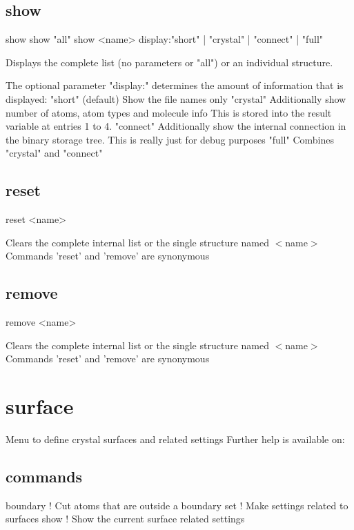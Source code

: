 \subsection*{show}
\begin{MacVerbatim}
show
show "all"
show <name>
   display:{"short" | "crystal" | "connect" | "full"}
\end{MacVerbatim}
Displays the complete list (no parameters or "all") 
or an individual structure. 
\par
The optional parameter "display:" determines the amount of 
information that is displayed: 
"short" (default)  Show the file names only 
"crystal"          Additionally show number of atoms, 
                   atom types and molecule info 
                   This is stored into the result variable 
                   at entries 1 to 4. 
"connect"          Additionally show the internal connection 
                   in the binary storage tree. This is really 
                   just for debug purposes 
"full"             Combines "crystal" and "connect" 
\subsection*{reset}
\begin{MacVerbatim}
reset {<name>}
\end{MacVerbatim}
Clears the complete internal list or the single structure 
named $ <$name$> $ 
Commands 'reset' and 'remove' are synonymous 
\subsection*{remove}
\begin{MacVerbatim}
remove {<name>}
\end{MacVerbatim}
Clears the complete internal list or the single structure 
named $ <$name$> $ 
Commands 'reset' and 'remove' are synonymous 
\section{surface}
\par
Menu to define crystal surfaces and related settings 
Further help is available on: 
\subsection*{commands}
\begin{MacVerbatim}
boundary   ! Cut atoms that are outside a boundary
set        ! Make settings related to surfaces
show       ! Show the current surface related settings
\end{MacVerbatim}
